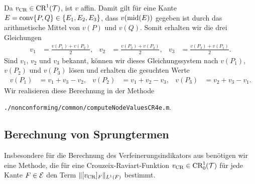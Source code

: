 Da $v_\textup{CR}\in\textup{CR}^1(\mathcal{T})$, ist $v$ affin. Damit gilt für eine Kante
$E=\textup{conv}\{P,Q\}\in\{E_1,E_2,E_3\}$, dass $v(\textup{mid}(E))$ gegeben ist durch das
arithmetische Mittel von $v(P)$ und $v(Q)$.
Somit erhalten wir die drei Gleichungen
\begin{align*}
  v_1 &= \frac{v(P_1)+v(P_2)}{2},  
  &v_2 &= \frac{v(P_2)+v(P_3)}{2},  
  &v_3 &= \frac{v(P_3)+v(P_1)}{2}.
\end{align*}
Sind $v_1$, $v_2$ und $v_3$ bekannt, können wir dieses Gleichungssystem nach 
$v(P_1)$, $v(P_2)$ und $v(P_3)$ lösen und erhalten die gesuchten Werte
\begin{align*}
 v(P_1)&=v_1+v_3-v_2, &v(P_2)&= v_1+v_2-v_3,&v(P_3)&=v_2+v_3-v_1.
\end{align*}
Wir realisieren diese Berechnung in der Methode
\begin{center}
  \texttt{./nonconforming/common/computeNodeValuesCR4e.m}.
\end{center} 


\subsection{Berechnung von Sprungtermen}
\label{sec:jumptTermsImplementation}

Insbesondere für die Berechnung des Verfeinerungsindikators aus
 benötigen wir eine Methode, die
für eine Crouzeix-Raviart-Funktion
$v_\textup{CR}\in\textup{CR}^1_0(\mathcal{T})$
für jede Kante $F\in\mathcal{E}$ den Term $\Vert [v_\textup{CR}]_F\Vert_{L^1(F)}$ 
bestimmt.

